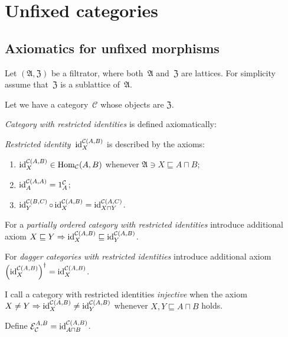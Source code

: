 \chapter{Unfixed categories}

\section{Axiomatics for unfixed morphisms}

Let $(\mathfrak{A},\mathfrak{Z})$ be a filtrator, where
both~$\mathfrak{A}$ and~$\mathfrak{Z}$ are lattices.
For simplicity assume that~$\mathfrak{Z}$ is a sublattice
of~$\mathfrak{A}$.

Let we have a category~$\mathcal{C}$ whose objects are
$\mathfrak{Z}$.

\begin{defn}
\emph{Category with restricted identities} is defined
axiomatically:

\emph{Restricted identity}~$\operatorname{id}^{\mathcal{C}(A,B)}_X$ is
described by the axioms:

\begin{enumerate}
\item $\operatorname{id}^{\mathcal{C}(A,B)}_X\in\operatorname{Hom}_{\mathcal{C}}(A,B)$
whenever $\mathfrak{A}\ni X\sqsubseteq A\sqcap B$;
\item $\operatorname{id}^{\mathcal{C}(A,A)}_A = 1^{\mathcal{C}}_A$;
\item $\operatorname{id}^{\mathcal{C}(B,C)}_Y \circ \operatorname{id}^{\mathcal{C}(A,B)}_X = \operatorname{id}^{\mathcal{C}(A,C)}_{X\sqcap Y}$.
\end{enumerate}

For a \emph{partially ordered category with restricted identities} introduce additional axiom $X\sqsubseteq Y\Rightarrow
\operatorname{id}^{\mathcal{C}(A,B)}_X\sqsubseteq\operatorname{id}^{\mathcal{C}(A,B)}_Y$.

For \emph{dagger categories with restricted identities} introduce additional axiom
$\left(\operatorname{id}^{\mathcal{C}(A,B)}_X\right)^\dagger =
\operatorname{id}^{\mathcal{C}(A,B)}_X$.
\end{defn}

\begin{defn}
I call a category with restricted identities
\emph{injective} when the axiom $X\ne Y\Rightarrow
\operatorname{id}^{\mathcal{C}(A,B)}_X\ne\operatorname{id}^{\mathcal{C}(A,B)}_Y$
whenever $X,Y\sqsubseteq A\sqcap B$ holds.
\end{defn}

\begin{defn}
Define $\mathcal{E}_{\mathcal{C}}^{A,B} =
\operatorname{id}^{\mathcal{C}(A,B)}_{A\sqcap B}$.
\end{defn}

